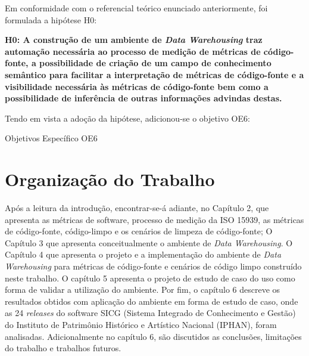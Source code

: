 Em conformidade com o referencial teórico enunciado anteriormente, foi formulada a hipótese H0:

\textbf{H0: A construção de um ambiente de \textit{Data Warehousing} traz automação necessária ao processo de medição de métricas de código-fonte, a possibilidade de criação de um campo de conhecimento semântico para facilitar a interpretação de métricas de código-fonte e a visibilidade necessária às métricas de código-fonte bem como a possibilidade de inferência de outras informações advindas destas.} 

Tendo em vista a adoção da hipótese, adicionou-se o objetivo OE6:
\begin{table}[H]
\centering

\caption{Objetivos Específico OE6}
\label{tbl:obj} 
\end{table}
\FloatBarrier


\section{Organização do Trabalho}

Após a leitura da introdução, encontrar-se-á adiante, no Capítulo 2, que apresenta as 
métricas de software, processo de medição da ISO 15939, 
as métricas de código-fonte, código-limpo e os cenários de limpeza de código-fonte; O Capítulo 3 que apresenta conceitualmente o ambiente de \textit{Data Warehousing}. O Capítulo 4 que apresenta o projeto e a implementação do ambiente de \textit{Data Warehousing} para métricas de código-fonte e cenários de código limpo construído neste trabalho. O capítulo 5 apresenta o projeto de estudo de caso do uso como forma de validar a utilização do ambiente. Por fim, o capítulo 6 descreve os resultados obtidos com aplicação do ambiente em forma de estudo de caso, onde as 24 \textit{releases} do software SICG (Sistema Integrado de Conhecimento e Gestão) do Instituto de Patrimônio Histórico e Artístico Nacional (IPHAN), foram analisadas. Adicionalmente no capítulo 6, são discutidos as conclusões, limitações do trabalho e trabalhos futuros.   
